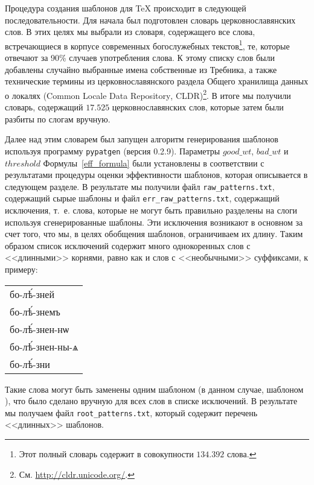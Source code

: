 \documentclass[12pt,a4paper,oneside]{extarticle}
\begin{document}
Процедура создания шаблонов для \TeX{} происходит в следующей последовательности. Для начала был подготовлен словарь церковнославянских слов. В этих целях мы выбрали из словаря, содержащего все слова, встречающиеся в корпусе современных богослужебных текстов\footnote{Этот полный словарь содержит в совокупности $134.392$ слова.}, те, которые отвечают за 90\% случаев употребления слова. К этому списку слов были добавлены случайно выбранные имена собственные из Требника, а также технические термины из церковнославянского раздела Общего хранилища данных о локалях (\textenglish{Common Locale Data Repository}, CLDR)\footnote{См. \url{http://cldr.unicode.org/}.}. В итоге мы получили словарь, содержащий $17.525$ церковнославянских слов, которые затем были разбиты по слогам вручную.

Далее над этим словарем был запущен алгоритм генерирования шаблонов используя программу \verb+pypatgen+ (версия 0.2.9). Параметры $good\_wt$, $bad\_wt$ и $threshold$ Формулы~\ref{eff_formula} были установлены в соответствии с результатами процедуры оценки эффективности шаблонов, которая описывается в следующем разделе. В результате мы получили файл \verb+raw_patterns.txt+, содержащий сырые шаблоны и файл \verb+err_raw_patterns.txt+, содержащий исключения, т.~е. слова, которые не могут быть правильно разделены на слоги используя сгенерированные шаблоны. Эти исключения возникают в основном за счет того, что мы, в целях обобщения шаблонов, ограничиваем их длину. Таким образом список исключений содержит много однокоренных слов с <<длинными>> корнями, равно как и слов с <<необычными>> суффиксами, к примеру:

\begin{center}
\begin{churchslavonic}
\begin{tabular}{l}
бо-лѣ́-зней \\
бо-лѣ́-знемъ \\
бо-лѣ́-знен-нѡ \\
бо-лѣ́-знен-ны-ѧ \\
бо-лѣ́-зни \\
\end{tabular}
\end{churchslavonic}
\end{center}

\noindent Такие слова могут быть заменены одним шаблоном (в данном случае, шаблоном ), что было сделано вручную для всех слов в списке исключений. В результате мы получаем файл \verb+root_patterns.txt+, который содержит перечень <<длинных>> шаблонов.
\end{document}
